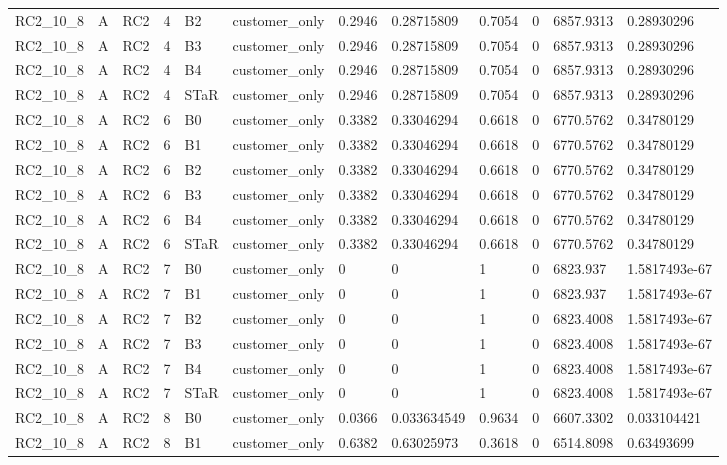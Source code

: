 \begin{longtable}{llllllllllll}
RC2\_10\_8 & A & RC2 & 4 & B2 & customer\_only & 0.2946 & 0.28715809 & 0.7054 & 0 & 6857.9313 & 0.28930296 \\
RC2\_10\_8 & A & RC2 & 4 & B3 & customer\_only & 0.2946 & 0.28715809 & 0.7054 & 0 & 6857.9313 & 0.28930296 \\
RC2\_10\_8 & A & RC2 & 4 & B4 & customer\_only & 0.2946 & 0.28715809 & 0.7054 & 0 & 6857.9313 & 0.28930296 \\
RC2\_10\_8 & A & RC2 & 4 & STaR & customer\_only & 0.2946 & 0.28715809 & 0.7054 & 0 & 6857.9313 & 0.28930296 \\
RC2\_10\_8 & A & RC2 & 6 & B0 & customer\_only & 0.3382 & 0.33046294 & 0.6618 & 0 & 6770.5762 & 0.34780129 \\
RC2\_10\_8 & A & RC2 & 6 & B1 & customer\_only & 0.3382 & 0.33046294 & 0.6618 & 0 & 6770.5762 & 0.34780129 \\
RC2\_10\_8 & A & RC2 & 6 & B2 & customer\_only & 0.3382 & 0.33046294 & 0.6618 & 0 & 6770.5762 & 0.34780129 \\
RC2\_10\_8 & A & RC2 & 6 & B3 & customer\_only & 0.3382 & 0.33046294 & 0.6618 & 0 & 6770.5762 & 0.34780129 \\
RC2\_10\_8 & A & RC2 & 6 & B4 & customer\_only & 0.3382 & 0.33046294 & 0.6618 & 0 & 6770.5762 & 0.34780129 \\
RC2\_10\_8 & A & RC2 & 6 & STaR & customer\_only & 0.3382 & 0.33046294 & 0.6618 & 0 & 6770.5762 & 0.34780129 \\
RC2\_10\_8 & A & RC2 & 7 & B0 & customer\_only & 0 & 0 & 1 & 0 & 6823.937 & 1.5817493e-67 \\
RC2\_10\_8 & A & RC2 & 7 & B1 & customer\_only & 0 & 0 & 1 & 0 & 6823.937 & 1.5817493e-67 \\
RC2\_10\_8 & A & RC2 & 7 & B2 & customer\_only & 0 & 0 & 1 & 0 & 6823.4008 & 1.5817493e-67 \\
RC2\_10\_8 & A & RC2 & 7 & B3 & customer\_only & 0 & 0 & 1 & 0 & 6823.4008 & 1.5817493e-67 \\
RC2\_10\_8 & A & RC2 & 7 & B4 & customer\_only & 0 & 0 & 1 & 0 & 6823.4008 & 1.5817493e-67 \\
RC2\_10\_8 & A & RC2 & 7 & STaR & customer\_only & 0 & 0 & 1 & 0 & 6823.4008 & 1.5817493e-67 \\
RC2\_10\_8 & A & RC2 & 8 & B0 & customer\_only & 0.0366 & 0.033634549 & 0.9634 & 0 & 6607.3302 & 0.033104421 \\
RC2\_10\_8 & A & RC2 & 8 & B1 & customer\_only & 0.6382 & 0.63025973 & 0.3618 & 0 & 6514.8098 & 0.63493699 \\

\end{longtable}
